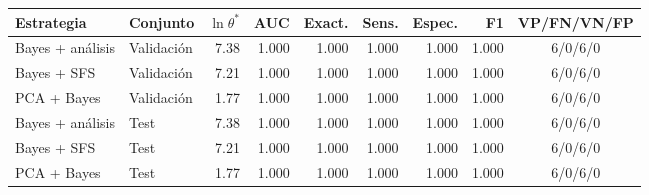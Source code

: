 \footnotesize
\begin{tabular}{llrrrrrrc}
\toprule
Estrategia & Conjunto & $\ln\theta^*$ & AUC & Exact. & Sens. & Espec. & F1 & VP/FN/VN/FP \\
\midrule
Bayes + análisis & Validación & 7.38 & 1.000 & 1.000 & 1.000 & 1.000 & 1.000 & 6/0/6/0 \\
Bayes + SFS & Validación & 7.21 & 1.000 & 1.000 & 1.000 & 1.000 & 1.000 & 6/0/6/0 \\
PCA + Bayes & Validación & 1.77 & 1.000 & 1.000 & 1.000 & 1.000 & 1.000 & 6/0/6/0 \\
\midrule
Bayes + análisis & Test & 7.38 & 1.000 & 1.000 & 1.000 & 1.000 & 1.000 & 6/0/6/0 \\
Bayes + SFS & Test & 7.21 & 1.000 & 1.000 & 1.000 & 1.000 & 1.000 & 6/0/6/0 \\
PCA + Bayes & Test & 1.77 & 1.000 & 1.000 & 1.000 & 1.000 & 1.000 & 6/0/6/0 \\
\bottomrule
\end{tabular}
